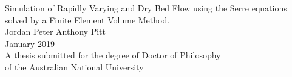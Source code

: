 \begin{titlepage}
\begin{center}

\vspace*{\fill} \Huge
                        Simulation of Rapidly Varying and Dry Bed Flow 
                        using the Serre equations solved by a Finite Element Volume Method.
\\
\vfill\vfill\Large
                          Jordan Peter Anthony Pitt
\\
\vfill\vfill
                          January 2019
\\
\vfill\vfill \normalsize
         A thesis submitted for the degree of Doctor of Philosophy\\
         of the Australian National University
\vfill
         \anulogo

\end{center}

\end{titlepage}
